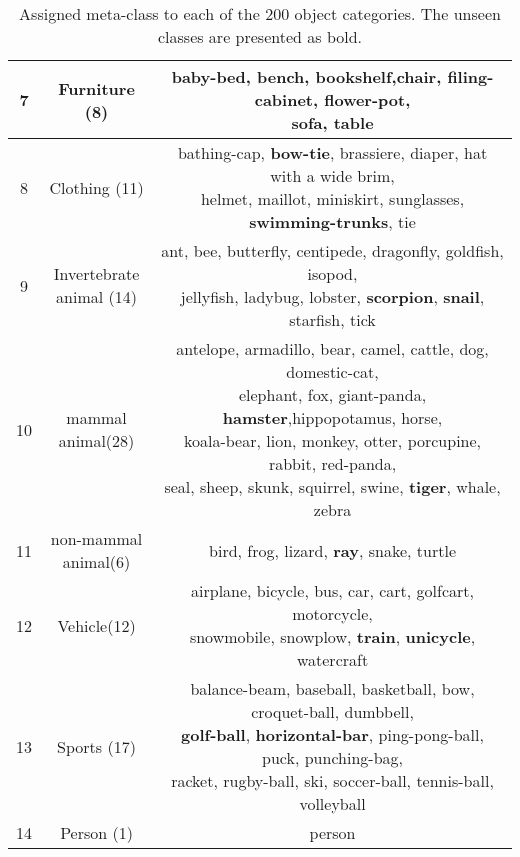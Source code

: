 \documentclass[runningheads]{llncs}
\begin{document}
\begin{table*}[!t]
\begin{center}
\begin{tabular}{|c|c|c|}
7&Furniture (8)&\makecell{baby-bed,	\textbf{bench}, bookshelf,chair,	filing-cabinet,	flower-pot,	\\sofa,	table} \\ \hline																				
8&Clothing (11)& \makecell{bathing-cap,	\textbf{bow-tie},	brassiere,	diaper,	hat with a wide brim,\\	helmet,	maillot,	miniskirt,	sunglasses, \textbf{swimming-trunks}, tie}	\\ \hline
       
9&\makecell{Invertebrate\\animal} (14)&\makecell{ant,	bee,	butterfly,	centipede,	dragonfly,	goldfish,	isopod,\\	jellyfish,	ladybug,	lobster,	\textbf{scorpion}, \textbf{snail},	starfish,	tick }\\ \hline

10&\makecell{mammal\\animal}(28)&	\makecell{antelope,	armadillo,	bear,	camel,	cattle,	dog,	domestic-cat,\\	elephant,	fox,	giant-panda,	\textbf{hamster},hippopotamus,	horse,	\\koala-bear,	lion,	monkey,	otter,	porcupine,	rabbit,	red-panda,	\\seal,	sheep,	skunk,	squirrel,	swine,	\textbf{tiger},	whale,	zebra} \\ \hline

11&\makecell{non-mammal\\animal}(6)&	bird,	frog,	lizard,	\textbf{ray},	snake,	turtle \\ \hline																				
12&Vehicle(12) & \makecell{airplane,	bicycle,	bus,	car,	cart,	golfcart, motorcycle,	\\snowmobile,	snowplow, \textbf{train},	\textbf{unicycle},	watercraft}	\\ \hline

13&Sports (17) & \makecell{balance-beam,	baseball,	basketball,	bow,	croquet-ball,	dumbbell,\\	\textbf{golf-ball},	\textbf{horizontal-bar},	ping-pong-ball,	puck,	punching-bag,\\	racket,	rugby-ball,	ski,	soccer-ball,	tennis-ball,	volleyball} \\ \hline
14&Person (1) & person \\
    \hline
    \end{tabular}
  \end{center}
  \caption{Assigned meta-class to each of the 200 object categories. The unseen classes are presented as bold.}
  \label{tab:superclasslist}
\end{table*} 
\end{document}
